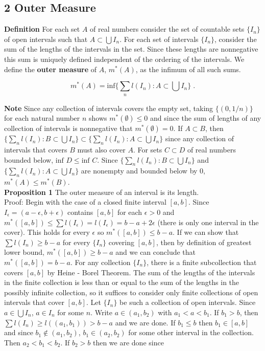 \documentclass[a4paper]{article}
\begin{document}
\subsection*{2 Outer Measure}

{\bf Definition} For each set $A$ of real numbers consider the set of countable sets $\{I_n\}$ of open intervals such that $A \subset \bigcup I_n$. For each set of intervals $\{I_n\}$, consider the sum of the lengths of the intervals in the set. Since these lengths are nonnegative this sum is uniquely defined independent of the ordering of the intervals. We define the {\bf outer measure} of $A$, $m^*(A)$, as the infimum of all such sums.

$$m^*(A) = \text{inf}\{\sum_n l(I_n) : A \subset \bigcup I_n\} \;.$$

{\bf Note} Since any collection of intervals covers the empty set, taking $\{(0,1/n)\}$ for each natural number $n$ shows $m^*(\emptyset) \leq 0$ and since the sum of lengths of any collection of intervals is nonnegative that $m^*(\emptyset) = 0$. If $A\subset B$, then $\{\sum_n l(I_n) : B \subset \bigcup I_n\} \subset \{\sum_n l(I_n) : A \subset \bigcup I_n\}$ since any collection of intervals that covers $B$ must also cover $A$. For sets $C \subset D$ of real numbers bounded below, $\text{inf } D \leq \text{inf } C$. Since $\{\sum_n l(I_n) : B \subset \bigcup I_n\}$ and $\{\sum_n l(I_n) : A \subset \bigcup I_n\}$ are nonempty and bounded below by 0, $m^*(A) \leq m^*(B)$.\\

{\bf Proposition 1} The outer measure of an interval is its length. \\

Proof: Begin with the case of a closed finite interval $[a,b]$. Since $I_\epsilon = (a-\epsilon, b + \epsilon)$ contains $[a,b]$ for each $\epsilon > 0$ and $m^*([a,b]) \leq \sum l(I_\epsilon) = l(I_\epsilon) = b-a + 2\epsilon$ (there is only one interval in the cover). This holds for every $\epsilon$ so $m^*([a,b]) \leq b-a$. If we can show that $\sum l(I_n) \geq b-a$ for every $\{I_n\}$ covering $[a,b]$, then by definition of greatest lower bound, $m^*([a,b]) \geq b-a$ and we can conclude that $m^*([a,b]) = b-a$. For any collection $\{I_n\}$, there is a finite subcollection that covers $[a,b]$ by Heine - Borel Theorem. The sum of the lengths of the intervals in the finite collection is less than or equal to the sum of the lengths in the possibly infinite collection, so it suffices to consider only finite collections of open intervals that cover $[a,b]$. Let $\{I_n\}$ be such a collection of open intervals. Since $a \in \bigcup I_n$, $a \in I_n$ for some $n$. Write $a \in (a_1,b_2)$ with $a_1<a<b_1$. If $b_1 > b$, then $\sum l(I_n) \geq l((a_1,b_1)) > b-a$ and we are done. If $b_1 \leq b$ then $b_1 \in [a,b]$ and since $b_1 \not\in (a_1,b_2)$, $b_1 \in (a_2,b_2)$ for some other interval in the collection. Then $a_2<b_1<b_2$. If $b_2 > b$ then we are done since
\end{document}
